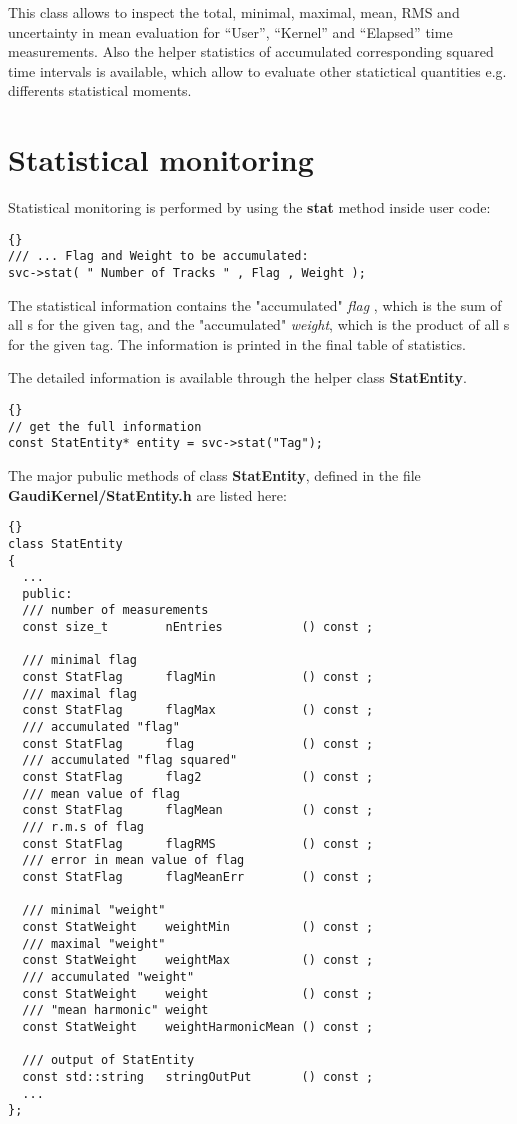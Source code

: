 \documentclass{lhcbnote}
\newcommand{\bftt}         {\ttfamily\bfseries}
\renewcommand{\it}         {\itshape}
\renewcommand{\tt}         {\ttfamily}
\begin{document}
This class allows to inspect the total, minimal, maximal,
mean, RMS and uncertainty in mean evaluation
for ``User'', ``Kernel'' and ``Elapsed'' time measurements.
Also the helper statistics of accumulated corresponding
squared time intervals  is available, which allow to evaluate
other statictical quantities e.g. differents statistical
moments.

\section{Statistical monitoring}

Statistical monitoring is performed by using the {\bftt{stat}} method
inside user code:

\begin{lstlisting}{}
/// ... Flag and Weight to be accumulated:
svc->stat( " Number of Tracks " , Flag , Weight );
\end{lstlisting}

The statistical information contains the
"accumulated" {\it flag }, which is the sum of all
{\tt{Flag}}s for the given tag, and the
"accumulated" {\it weight}, which is the product of all
{\tt{Weight}}s for the given tag.
The information is printed in the final table of
statistics.

The detailed information is available through
the helper class {\bftt{StatEntity}}.

\begin{lstlisting}{}
// get the full information
const StatEntity* entity = svc->stat("Tag");
\end{lstlisting}

The major pubulic methods of class {\bftt{StatEntity}}, defined
in the file {\bftt{GaudiKernel/StatEntity.h}} are listed here:

\begin{lstlisting}{}
class StatEntity
{
  ...
  public:
  /// number of measurements
  const size_t        nEntries           () const ;

  /// minimal flag
  const StatFlag      flagMin            () const ;
  /// maximal flag
  const StatFlag      flagMax            () const ;
  /// accumulated "flag"
  const StatFlag      flag               () const ;
  /// accumulated "flag squared"
  const StatFlag      flag2              () const ;
  /// mean value of flag
  const StatFlag      flagMean           () const ;
  /// r.m.s of flag
  const StatFlag      flagRMS            () const ;
  /// error in mean value of flag
  const StatFlag      flagMeanErr        () const ;

  /// minimal "weight"
  const StatWeight    weightMin          () const ;
  /// maximal "weight"
  const StatWeight    weightMax          () const ;
  /// accumulated "weight"
  const StatWeight    weight             () const ;
  /// "mean harmonic" weight
  const StatWeight    weightHarmonicMean () const ;

  /// output of StatEntity
  const std::string   stringOutPut       () const ;
  ...
};
\end{lstlisting}
\end{document}
